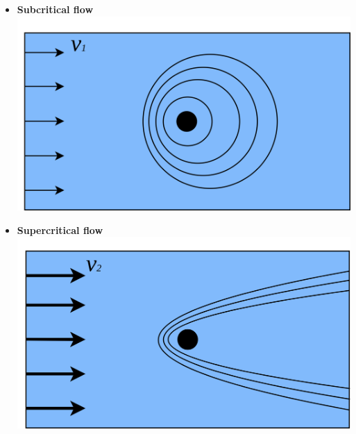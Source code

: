 \begin{frame}
\begin{minipage}{0.45\textwidth}
\begin{itemize}
\vspace{1cm}
\item<1->[] 
\centering
{\LARGE \textbf{Subcritical flow}}\\[0.15cm]
\hspace{0.2cm}
\includegraphics[width=1\textwidth]{Resources/Images/subcritical.png}
\end{itemize}
\end{minipage}
\hspace{1cm}
\begin{minipage}{0.45\textwidth}
\centering
\begin{itemize}
\vspace{1cm}
\item<2->[] 
\centering
{\LARGE \textbf{Supercritical flow}}\\[0.15cm]
\hspace{0.25cm}
\includegraphics[width=1\textwidth]{Resources/Images/supercritical.png}
\end{itemize}
\end{minipage}
\end{frame}

\clearpage


